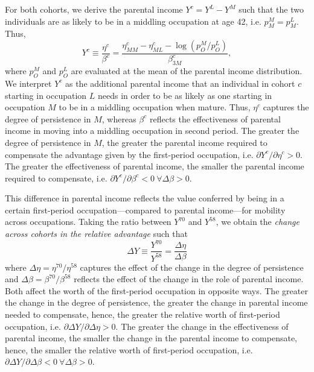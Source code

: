 For both cohorts, we derive the parental income $Y^c=Y^L-Y^M$ such that the two individuals are as likely to be in a middling occupation at age 42, i.e. $p_{M}^{M}=p_{M}^{L}$. Thus,
\begin{equation}\label{chap2-eq:counter-Y}
    Y^c \equiv \frac{\eta^c}{\beta^c} = \frac{\eta^c_{MM} -\eta^c_{ML} - \log(p_O^M/p_O^L)}{\beta^c_{3M}},
\end{equation}
where $p_O^M$ and $p_O^L$ are evaluated at the mean of the parental income distribution. We interpret $Y^c$ as the additional parental income that an individual in cohort $c$ starting in occupation $L$ needs in order to be as likely as one starting in occupation $M$ to be in a middling occupation when mature.
Thus, $\eta^c$ captures the degree of persistence in $M$, whereas $\beta^c$ reflects the effectiveness of parental income in moving into a middling occupation in second period. The greater the degree of persistence in $M$, the greater the parental income required to compensate the advantage given by the first-period occupation, i.e. $\partial Y^c/\partial\eta^c > 0$. The greater the effectiveness of parental income, the smaller the parental income required to compensate, i.e. $\partial Y^c/\partial\beta^c < 0~\forall\Delta\beta > 0$.

This difference in parental income reflects the value conferred by being in a certain first-period occupation---compared to parental income---for mobility across occupations. Taking the ratio between $Y^{70}$ and $Y^{58}$, we obtain the \emph{change across cohorts in the relative advantage} such that
\begin{equation}\label{chap2-eq:delta-Y}
    \Delta Y \equiv \frac{Y^{70}}{Y^{58}}= \frac{\Delta\eta}{\Delta\beta}
\end{equation}
where $\Delta\eta = \eta^{70}/\eta^{58}$ captures the effect of the change in the degree of persistence and $\Delta\beta = \beta^{70}/\beta^{58}$ reflects the effect of the change in the role of parental income. 
Both affect the worth of the first-period occupation in opposite ways.
The greater the change in the degree of persistence, the greater the change in parental income needed to compensate, hence, the greater the relative worth of first-period occupation, i.e. $\partial\Delta Y/\partial\Delta\eta > 0$.
The greater the change in the effectiveness of parental income, the smaller the change in the parental income to compensate, hence, the smaller the relative worth of first-period occupation, i.e. $\partial\Delta Y/\partial\Delta\beta < 0~\forall\Delta\beta > 0$.

